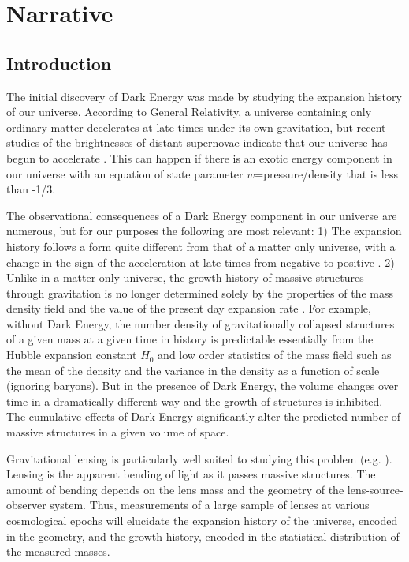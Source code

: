 \documentclass[12pt]{article}
\begin{document}

\newpage
{}
\section*{Narrative}
\setcounter{section}{1}
\subsection{Introduction}

The initial discovery of Dark Energy was made by studying the expansion history
of our universe.  According to General Relativity, a universe containing only
ordinary matter decelerates at late times under its own gravitation, but recent
studies of the brightnesses of distant supernovae indicate that our universe
has begun to accelerate \cite{Riess98,Perlmutter99}.  This can happen if there
is an exotic energy component in our universe with an equation of state
parameter $w$=pressure/density that is less than -1/3.

The observational consequences of a Dark Energy component in our universe are
numerous, but for our purposes the following are most relevant: 1) The
expansion history follows a form quite different from that of a matter only
universe, with a change in the sign of the acceleration at late times from
negative to positive \cite{Carroll92}.  2)  Unlike in a matter-only universe,
the growth history of massive structures through gravitation is no longer
determined solely by the properties of the mass density field and the value of
the present day expansion rate \cite{Haiman01}.  For example, without Dark
Energy, the number density of gravitationally collapsed structures of a given
mass at a given time in history is predictable essentially from the Hubble
expansion constant $H_0$ and low order statistics of the mass field such as the
mean of the density and the variance in the density as a function of scale
(ignoring baryons).  But in the presence of Dark Energy, the volume changes
over time in a dramatically different way and the growth of structures is
inhibited.  The cumulative effects of Dark Energy significantly alter the
predicted number of massive structures in a given volume of space.

Gravitational lensing is particularly well suited to studying this problem
(e.g. \cite{Kaiser98,Hu04}).  Lensing is the apparent bending of light as it
passes massive structures.  The amount of bending depends on the lens mass and
the geometry of the lens-source-observer system.  Thus, measurements of a large
sample of lenses at various cosmological epochs will elucidate the expansion
history of the universe, encoded in the geometry, and the growth history,
encoded in the statistical distribution of the measured masses.  
\end{document}
